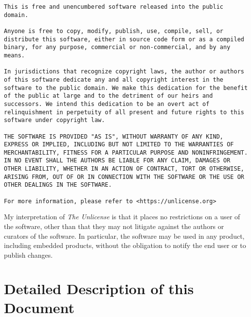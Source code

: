 \begin{small}
\begin{verbatim}
This is free and unencumbered software released into the public domain.

Anyone is free to copy, modify, publish, use, compile, sell, or
distribute this software, either in source code form or as a compiled
binary, for any purpose, commercial or non-commercial, and by any
means.

In jurisdictions that recognize copyright laws, the author or authors
of this software dedicate any and all copyright interest in the
software to the public domain. We make this dedication for the benefit
of the public at large and to the detriment of our heirs and
successors. We intend this dedication to be an overt act of
relinquishment in perpetuity of all present and future rights to this
software under copyright law.

THE SOFTWARE IS PROVIDED "AS IS", WITHOUT WARRANTY OF ANY KIND,
EXPRESS OR IMPLIED, INCLUDING BUT NOT LIMITED TO THE WARRANTIES OF
MERCHANTABILITY, FITNESS FOR A PARTICULAR PURPOSE AND NONINFRINGEMENT.
IN NO EVENT SHALL THE AUTHORS BE LIABLE FOR ANY CLAIM, DAMAGES OR
OTHER LIABILITY, WHETHER IN AN ACTION OF CONTRACT, TORT OR OTHERWISE,
ARISING FROM, OUT OF OR IN CONNECTION WITH THE SOFTWARE OR THE USE OR
OTHER DEALINGS IN THE SOFTWARE.

For more information, please refer to <https://unlicense.org>
\end{verbatim}
\end{small}

My interpretation of \emph{The Unlicense} is that it places no restrictions
on a user of the software, other than that they may not litigate against
the authors or curators of the software.  In particular, the software may
be used in any product, including embedded products, without the obligation
to notify the end user or to publish changes.


\section{Detailed Description of this Document}
\label{ciov0:sotd0}

